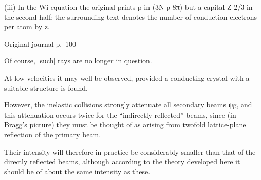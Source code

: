 \documentclass[10pt]{article}
\newcommand{\origpage}[1]{\par\medskip\noindent\hfill{\small\color{notegray}Original journal p.~#1}\hfill\mbox{}\par\smallskip}
\begin{document}
(iii) In the Wi equation the original prints p in (3N p 8π) but a capital Z 2/3 in the second half; the surrounding text denotes the number of conduction electrons per atom by z.\par
\origpage{100}
Of course, [such] rays are no longer in question.\par
At low velocities it may well be observed, provided a conducting crystal with a suitable structure is found.\par
However, the inelastic collisions strongly attenuate all secondary beams ψg, and this attenuation occurs twice for the “indirectly reflected” beams, since (in Bragg’s picture) they must be thought of as arising from twofold lattice-plane reflection of the primary beam.\par
Their intensity will therefore in practice be considerably smaller than that of the directly reflected beams, although according to the theory developed here it should be of about the same intensity as these.\par
\end{document}

